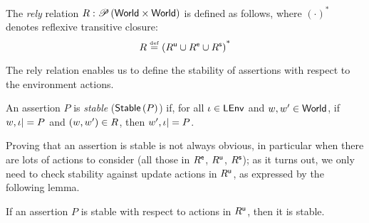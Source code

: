 \begin{definition}[Rely]
  The \emph{rely} relation $R: \mathscr{P}\left(\textsf{World} \times \textsf{World} \right)$ is
  defined as follows, where $(\cdot)^{\text{*}}$ denotes reflexive
  transitive closure:
\vspace{-1ex}
  \[
\vspace{-1ex}
  \rely \eqdef  \left(\updateR \cup \extendR \cup \shiftR \right)^{\text{*}}
  \]
\end{definition}

The rely relation enables us to define the stability of assertions
with respect to the environment actions.
\begin{definition}[Stability]
  An assertion $P$ is \emph{stable} ($\textsf{Stable}\left(P\right)$) if, for all $\iota
  \in \textsf{LEnv}$ and $w, w' \in \textsf{World}$, if $w, \iota |= P$ and $(w, w')
  \in R$, then $w', \iota |= P$.
\end{definition}

Proving that an assertion is stable is not always obvious, in
particular when there are lots of actions to consider (all those in
$R^{\textsf{e}}$, $R^{\textsf{u}}$, $R^{\textsf{s}}$); as it turns out, we only need to
check stability against update actions in $R^{\textsf{u}}$, as expressed by
the following lemma.

\begin{lemma}[Stability]
  If an assertion $P$ is stable with respect to actions in $R^{\textsf{u}}$,
  then it is stable.
	 
\end{lemma}


